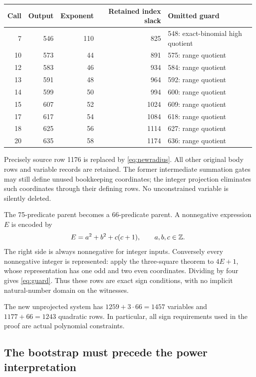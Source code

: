 \begin{center}\small
\begin{tabular}{rrrrl}
\toprule
Call & Output & Exponent & Retained index slack & Omitted guard\\
\midrule
7&546&110&825&548: exact-binomial high quotient\\
10&573&44&891&575: range quotient\\
12&583&46&934&584: range quotient\\
13&591&48&964&592: range quotient\\
14&599&50&994&600: range quotient\\
15&607&52&1024&609: range quotient\\
17&617&54&1084&618: range quotient\\
18&625&56&1114&627: range quotient\\
20&635&58&1174&636: range quotient\\
\bottomrule
\end{tabular}
\end{center}

Precisely source row 1176 is replaced by \eqref{eq:newradius}. All other original body rows and variable records are retained. The former intermediate summation gates may still define unused bookkeeping coordinates; the integer projection eliminates such coordinates through their defining rows. No unconstrained variable is silently deleted.

The 75-predicate parent becomes a 66-predicate parent. A nonnegative expression \(E\) is encoded by
\begin{equation}\label{eq:guard}
E=a^2+b^2+c(c+1),\qquad a,b,c\in\mathbb Z.
\end{equation}
The right side is always nonnegative for integer inputs. Conversely every nonnegative integer is represented: apply the three-square theorem to \(4E+1\), whose representation has one odd and two even coordinates. Dividing by four gives \eqref{eq:guard}. Thus these rows are exact sign conditions, with no implicit natural-number domain on the witnesses.

The new unprojected system has \(1259+3\cdot66=1457\) variables and \(1177+66=1243\) quadratic rows. In particular, all sign requirements used in the proof are actual polynomial constraints.

\subsection{The bootstrap must precede the power interpretation}

